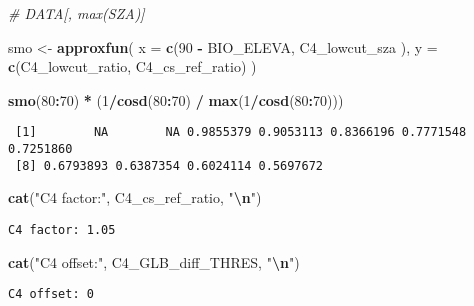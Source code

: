 \documentclass[
  10pt,
  a4paper,oneside]{article}
\newenvironment{Shaded}{\begin{snugshade}}{\end{snugshade}}
\newcommand{\AttributeTok}[1]{\textcolor[rgb]{0.13,0.29,0.53}{#1}}
\newcommand{\CommentTok}[1]{\textcolor[rgb]{0.56,0.35,0.01}{\textit{#1}}}
\newcommand{\DecValTok}[1]{\textcolor[rgb]{0.00,0.00,0.81}{#1}}
\newcommand{\FunctionTok}[1]{\textcolor[rgb]{0.13,0.29,0.53}{\textbf{#1}}}
\newcommand{\NormalTok}[1]{#1}
\newcommand{\OtherTok}[1]{\textcolor[rgb]{0.56,0.35,0.01}{#1}}
\newcommand{\SpecialCharTok}[1]{\textcolor[rgb]{0.81,0.36,0.00}{\textbf{#1}}}
\newcommand{\StringTok}[1]{\textcolor[rgb]{0.31,0.60,0.02}{#1}}
\begin{document}
\begin{Shaded}
\begin{Highlighting}[]
\CommentTok{\# DATA[, max(SZA)]}

\NormalTok{smo }\OtherTok{\textless{}{-}} \FunctionTok{approxfun}\NormalTok{(}
    \AttributeTok{x =} \FunctionTok{c}\NormalTok{(}\DecValTok{90} \SpecialCharTok{{-}}\NormalTok{ BIO\_ELEVA, C4\_lowcut\_sza  ),}
    \AttributeTok{y =} \FunctionTok{c}\NormalTok{(C4\_lowcut\_ratio,  C4\_cs\_ref\_ratio)}
\NormalTok{    )}

\FunctionTok{smo}\NormalTok{(}\DecValTok{80}\SpecialCharTok{:}\DecValTok{70}\NormalTok{) }\SpecialCharTok{*}\NormalTok{ (}\DecValTok{1}\SpecialCharTok{/}\FunctionTok{cosd}\NormalTok{(}\DecValTok{80}\SpecialCharTok{:}\DecValTok{70}\NormalTok{) }\SpecialCharTok{/} \FunctionTok{max}\NormalTok{(}\DecValTok{1}\SpecialCharTok{/}\FunctionTok{cosd}\NormalTok{(}\DecValTok{80}\SpecialCharTok{:}\DecValTok{70}\NormalTok{)))}
\end{Highlighting}
\end{Shaded}

\begin{verbatim}
 [1]        NA        NA 0.9855379 0.9053113 0.8366196 0.7771548 0.7251860
 [8] 0.6793893 0.6387354 0.6024114 0.5697672
\end{verbatim}

\begin{Shaded}
\begin{Highlighting}[]
\FunctionTok{cat}\NormalTok{(}\StringTok{"C4 factor:"}\NormalTok{, C4\_cs\_ref\_ratio,   }\StringTok{"}\SpecialCharTok{\textbackslash{}n}\StringTok{"}\NormalTok{)}
\end{Highlighting}
\end{Shaded}

\begin{verbatim}
C4 factor: 1.05 
\end{verbatim}

\begin{Shaded}
\begin{Highlighting}[]
\FunctionTok{cat}\NormalTok{(}\StringTok{"C4 offset:"}\NormalTok{, C4\_GLB\_diff\_THRES, }\StringTok{"}\SpecialCharTok{\textbackslash{}n}\StringTok{"}\NormalTok{)}
\end{Highlighting}
\end{Shaded}

\begin{verbatim}
C4 offset: 0 
\end{verbatim}
\end{document}
